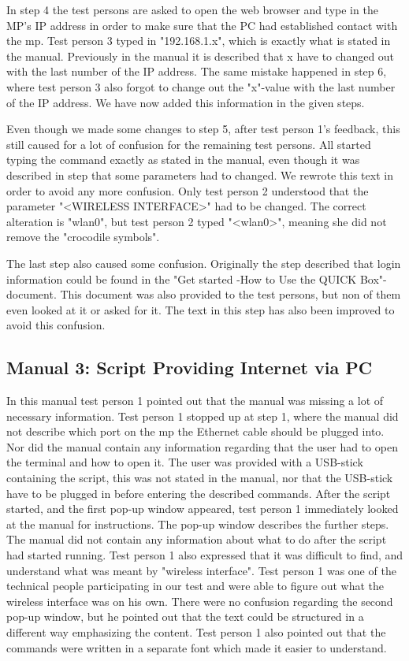 In step 4 the test persons are asked to open the web browser and type in the MP's IP address in order to make sure that the PC had established contact with the \gls{mp}. Test person 3 typed in "192.168.1.x", which is exactly what is stated in the manual. Previously in the manual it is described that x have to changed out with the last number of the IP address. The same mistake happened in step 6, where test person 3 also forgot to change out the "x"-value with the last number of the IP address.  We have now added this information in the given steps. 

Even though we made some changes to step 5, after test person 1's feedback, this still caused for a lot of confusion for the remaining test persons. All started typing the command exactly as stated in the manual, even though it was described in step that some parameters had to changed. We rewrote this text in order to avoid any more confusion. Only test person 2 understood that the parameter "<WIRELESS INTERFACE>" had to be changed. The correct alteration is "wlan0", but test person 2 typed "<wlan0>", meaning she did not remove the "crocodile symbols".

The last step also caused some confusion. Originally the step described that login information could be found in the "Get started -How to Use the QUICK Box"-document. This document was also provided to the test persons, but non of them even looked at it or asked for it. The text in this step has also been improved to avoid this confusion.

\subsection{Manual 3: Script Providing Internet via PC}
In this manual test person 1 pointed out that the manual was missing a lot of necessary information. Test person 1 stopped up at step 1, where the manual did not describe which port on the \gls{mp} the Ethernet cable should be plugged into. Nor did the manual contain any information regarding that the user had to open the terminal and how to open it. The user was provided with a USB-stick containing the script, this was not stated in the manual, nor that the USB-stick have to be plugged in before entering the described commands. After the script started, and the first pop-up window appeared, test person 1 immediately looked at the manual for instructions. The pop-up window describes the further steps. The manual did not contain any information about what to do after the script had started running. Test person 1 also expressed that it was difficult to find, and understand what was meant by "wireless interface". Test person 1 was one of the technical people participating in our test and were able to figure out what the wireless interface was on his own. There were no confusion regarding the second pop-up window, but he pointed out that the text could be structured in a different way emphasizing the content.
Test person 1 also pointed out that the commands were written in a separate font which made it easier to understand. 

